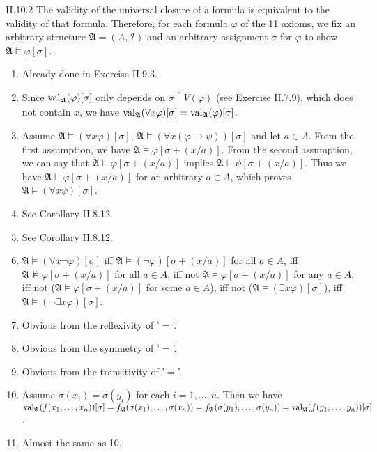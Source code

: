 \documentclass[12pt]{article}
\begin{document}
\begin{customthm}{II.10.2}
  The validity of the universal closure of a formula is equivalent to the validity of that formula. Therefore, for each formula $\varphi$ of the 11 axioms, we fix an arbitrary structure $\mathfrak{A}=(A,\mathcal{I})$ and an arbitrary assignment $\sigma$ for $\varphi$ to show $\mathfrak{A}\models\varphi[\sigma]$.
  \begin{enumerate}
    \item Already done in Exercise II.9.3.
    \item Since $\mathop{\mathrm{val}}_\mathfrak{A}(\varphi)[\sigma]$ only depends on $\sigma\upharpoonright V(\varphi)$ (see Exercise II.7.9), which does not contain $x$, we have $\mathop{\mathrm{val}}_\mathfrak{A}(\forall x\varphi)[\sigma]=\mathop{\mathrm{val}}_\mathfrak{A}(\varphi)[\sigma]$.
    \item Assume $\mathfrak{A}\models(\forall x\varphi)[\sigma]$, $\mathfrak{A}\models(\forall x(\varphi\rightarrow\psi))[\sigma]$ and let $a\in A$. From the first assumption, we have $\mathfrak{A}\models\varphi[\sigma+(x/a)]$. From the second assumption, we can say that $\mathfrak{A}\models\varphi[\sigma+(x/a)]$ implies $\mathfrak{A}\models\psi[\sigma+(x/a)]$. Thus we have $\mathfrak{A}\models\varphi[\sigma+(x/a)]$ for an arbitrary $a\in A$, which proves $\mathfrak{A}\models(\forall x\psi)[\sigma]$.
    \item See Corollary II.8.12.
    \item See Corollary II.8.12.
    \item $\mathfrak{A}\models(\forall x\neg\varphi)[\sigma]$ iff $\mathfrak{A}\models(\neg\varphi)[\sigma+(x/a)]$ for all $a\in A$, iff $\mathfrak{A}\not\models\varphi[\sigma+(x/a)]$ for all $a\in A$, iff not $\mathfrak{A}\models\varphi[\sigma+(x/a)]$ for any $a\in A$, iff not ($\mathfrak{A}\models\varphi[\sigma+(x/a)]$ for some $a\in A$), iff not ($\mathfrak{A}\models(\exists x\varphi)[\sigma]$), iff $\mathfrak{A}\models(\neg\exists x\varphi)[\sigma]$.
    \item Obvious from the reflexivity of '$=$'.
    \item Obvious from the symmetry of '$=$'.
    \item Obvious from the transitivity of '$=$'.
    \item Assume $\sigma(x_i)=\sigma(y_i)$ for each $i=1,\ldots,n$. Then we have $\mathop{\mathrm{val}}_\mathfrak{A}(f(x_1,\ldots,x_n))[\sigma]=f_\mathfrak{A}(\sigma(x_1),\ldots,\sigma(x_n))=f_\mathfrak{A}(\sigma(y_1),\ldots,\sigma(y_n))=\mathop{\mathrm{val}}_\mathfrak{A}(f(y_1,\ldots,y_n))[\sigma]$.
    \item Almost the same as 10.
  \end{enumerate}
\end{customthm}
\end{document}

